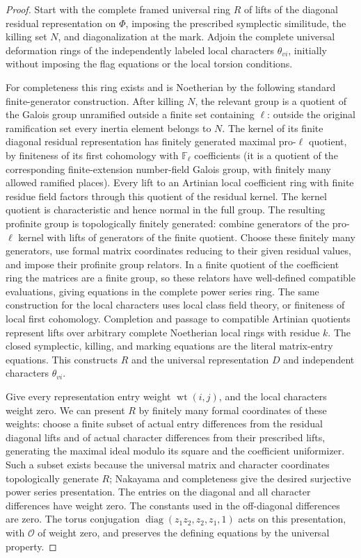 \begin{proof}
Start with the complete framed universal ring $R$ of lifts
of the diagonal residual representation on $\Phi$,
imposing the prescribed symplectic similitude, the killing
set $N$, and diagonalization at the mark. Adjoin the complete
universal deformation rings of the independently labeled
local characters $\theta_{vi}$, initially without imposing
the flag equations or the local torsion conditions.

For completeness this ring exists and is Noetherian by the
following standard finite-generator construction. After
killing $N$, the relevant group is a quotient of the Galois
group unramified outside a finite set containing $\ell$:
outside the original ramification set every inertia element
belongs to $N$. The kernel of its finite diagonal residual
representation has finitely generated maximal pro-$\ell$
quotient, by finiteness of its first cohomology with
$\mathbb F_\ell$ coefficients (it is a quotient of the
corresponding finite-extension number-field Galois group,
with finitely many allowed ramified places). Every lift
to an Artinian local coefficient ring with finite residue
field factors through this quotient of the residual kernel.
The kernel quotient is characteristic and hence normal
in the full group. The resulting profinite group is
topologically finitely generated: combine generators of
the pro-$\ell$ kernel with lifts of generators of the
finite quotient. Choose these finitely many generators,
use formal matrix coordinates reducing to their given
residual values, and impose their profinite group relators.
In a finite quotient of the coefficient ring the matrices
are a finite group, so these relators have well-defined
compatible evaluations, giving equations in the complete
power series ring. The same construction for the local
characters uses local class field theory, or finiteness of
local first cohomology. Completion and passage to compatible
Artinian quotients represent lifts over arbitrary complete
Noetherian local rings with residue $k$. The closed
symplectic, killing, and marking equations are the literal
matrix-entry equations. This constructs $R$ and the
universal representation $D$ and independent characters
$\theta_{vi}$.

Give every representation entry weight
$\operatorname{wt}(i,j)$, and the local characters weight
zero. We can present $R$ by finitely many formal coordinates
of these weights: choose a finite subset of actual entry
differences from the residual diagonal lifts and of actual
character differences from their prescribed lifts,
generating the maximal ideal modulo its square and the
coefficient uniformizer. Such a subset exists because
the universal matrix and character coordinates topologically
generate $R$; Nakayama and completeness give the desired
surjective power series presentation. The entries on the
diagonal and all character differences have weight zero.
The constants used in the off-diagonal differences are
zero. The torus conjugation
$\operatorname{diag}(z_1z_2,z_2,z_1,1)$ acts on this
presentation, with $\mathcal O$ of weight zero, and
preserves the defining equations by the universal property.


\end{proof}
